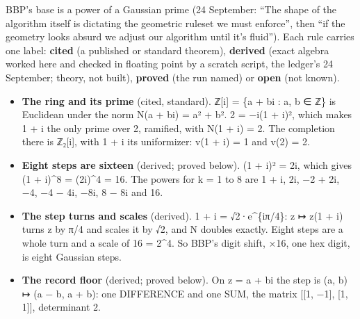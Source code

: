 BBP's base is a power of a Gaussian prime (24 September: “The shape of the algorithm itself is dictating the geometric ruleset we must enforce”, then “if the geometry looks absurd we adjust our algorithm until it's fluid”). Each rule carries one label: \textbf{cited} (a published or standard theorem), \textbf{derived} (exact algebra worked here and checked in floating point by a scratch script, the ledger's 24 September; theory, not built), \textbf{proved} (the run named) or \textbf{open} (not known).

\begin{itemize}
\item \textbf{The ring and its prime} (cited, standard). ℤ[i] = \{a + bi : a, b ∈ ℤ\} is Euclidean under the norm N(a + bi) = a² + b². 2 = −i(1 + i)², which makes 1 + i the only prime over 2, ramified, with N(1 + i) = 2. The completion there is ℤ₂[i], with 1 + i its uniformizer: v(1 + i) = 1 and v(2) = 2.
\item \textbf{Eight steps are sixteen} (derived; proved below). (1 + i)² = 2i, which gives (1 + i)\textasciicircum{}8 = (2i)\textasciicircum{}4 = 16. The powers for k = 1 to 8 are 1 + i, 2i, −2 + 2i, −4, −4 − 4i, −8i, 8 − 8i and 16.
\item \textbf{The step turns and scales} (derived). 1 + i = √2·e\textasciicircum{}\{iπ/4\}: z ↦ z(1 + i) turns z by π/4 and scales it by √2, and N doubles exactly. Eight steps are a whole turn and a scale of 16 = 2\textasciicircum{}4. So BBP's digit shift, ×16, one hex digit, is eight Gaussian steps.
\item \textbf{The record floor} (derived; proved below). On z = a + bi the step is (a, b) ↦ (a − b, a + b): one DIFFERENCE and one SUM, the matrix [[1, −1], [1, 1]], determinant 2.


\end{itemize}
